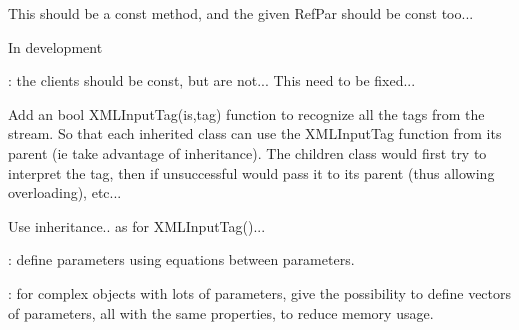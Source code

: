\begin{DoxyRefList}
\item[Member \mbox{\hyperlink{class_obj_cryst_1_1_refinable_obj_a1946baf8a64267d50ffe6a79b96f4add}{Obj\+Cryst::Refinable\+Obj::Get\+L\+S\+Q\+Deriv}} (const unsigned int, \mbox{\hyperlink{class_obj_cryst_1_1_refinable_par}{Refinable\+Par}} \&)]\label{todo__todo000005}%
%
This should be a const method, and the given Ref\+Par should be const too...  
\item[Member \mbox{\hyperlink{class_obj_cryst_1_1_refinable_obj_a7fded30f5419980ea110a651d6617cc0}{Obj\+Cryst::Refinable\+Obj::m\+L\+S\+Q\+\_\+\+Full\+Deriv}} ]\label{todo__todo000009}%
%
In development  
\item[Member \mbox{\hyperlink{class_obj_cryst_1_1_refinable_obj_a19bf35f9dd14319f8ae79828ce67bd70}{Obj\+Cryst::Refinable\+Obj::Register\+Client}} (\mbox{\hyperlink{class_obj_cryst_1_1_refinable_obj}{Refinable\+Obj}} \&) const]\label{todo__todo000004}%
%
\+: the clients should be const, but are not... This need to be fixed...  
\item[Member \mbox{\hyperlink{class_obj_cryst_1_1_refinable_obj_a3e3466a6945fec22d5f371a1a1478b62}{Obj\+Cryst::Refinable\+Obj::X\+M\+L\+Input}} (istream \&is, const \mbox{\hyperlink{class_obj_cryst_1_1_x_m_l_cryst_tag}{X\+M\+L\+Cryst\+Tag}} \&tag)]\label{todo__todo000008}%
%
Add an bool X\+M\+L\+Input\+Tag(is,tag) function to recognize all the tags from the stream. So that each inherited class can use the X\+M\+L\+Input\+Tag function from its parent (ie take advantage of inheritance). The children class would first try to interpret the tag, then if unsuccessful would pass it to its parent (thus allowing overloading), etc...  
\item[Member \mbox{\hyperlink{class_obj_cryst_1_1_refinable_obj_a1e57fe5e669121f04f98a2518df1e99f}{Obj\+Cryst::Refinable\+Obj::X\+M\+L\+Output}} (ostream \&os, int indent=0) const]\label{todo__todo000007}%
%
Use inheritance.. as for X\+M\+L\+Input\+Tag()...  
\item[Class \mbox{\hyperlink{class_obj_cryst_1_1_refinable_par}{Obj\+Cryst::Refinable\+Par}} ]\label{todo__todo000001}%
%
\+: define parameters using equations between parameters. 

\+: for complex objects with lots of parameters, give the possibility to define vectors of parameters, all with the same properties, to reduce memory usage. 
\end{DoxyRefList}